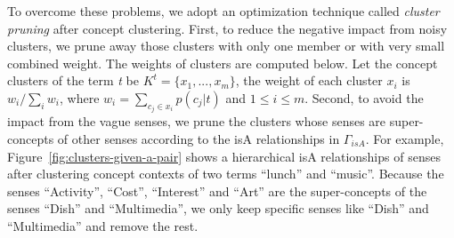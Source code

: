 To overcome these problems, we adopt an optimization technique called
{\em cluster pruning} after concept clustering.
First, to reduce the negative impact from noisy clusters,
we prune away those clusters with only one member or with very small combined weight.
The weights of clusters are computed below. Let the concept clusters of the term \emph{t} be $K^t = \{x_1,...,x_m\}$,
the weight of each cluster $x_i$ is $w_i/\sum_{i}w_i$, where
$w_i = \sum_{c_j\in x_i}p(c_j|t)$ and $1 \leq i \leq m$.
Second, to avoid the impact from the vague senses, we prune the clusters whose senses are super-concepts of other senses according to the isA
relationships in $\Gamma_{isA}$. For example, Figure~\ref{fig:clusters-given-a-pair} shows a hierarchical isA relationships of senses after
clustering concept contexts of two terms ``lunch'' and ``music''. Because the senses ``Activity'', ``Cost'', ``Interest'' and ``Art'' are the
super-concepts of the senses ``Dish'' and ``Multimedia'', we only keep specific senses like ``Dish'' and ``Multimedia'' and remove the rest.

